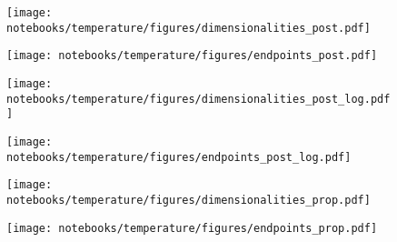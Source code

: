 \documentclass[10pt, a4paper]{article}
\begin{document}
\begin{figure}
\begin{center}
    \texttt{[image: notebooks/temperature/figures/dimensionalities\_post.pdf]}
\end{center}
\end{figure}
\begin{figure}
\begin{center}
    \texttt{[image: notebooks/temperature/figures/endpoints\_post.pdf]}
\end{center}
\end{figure}

\newpage
\begin{figure}
\begin{center}
    \texttt{[image: notebooks/temperature/figures/dimensionalities\_post\_log.pdf]}
\end{center}
\end{figure}
\begin{figure}
\begin{center}
    \texttt{[image: notebooks/temperature/figures/endpoints\_post\_log.pdf]}
\end{center}
\end{figure}

\newpage
\begin{figure}
\begin{center}
    \texttt{[image: notebooks/temperature/figures/dimensionalities\_prop.pdf]}
\end{center}
\end{figure}
\begin{figure}
\begin{center}
    \texttt{[image: notebooks/temperature/figures/endpoints\_prop.pdf]}
\end{center}
\end{figure}
\end{document}
